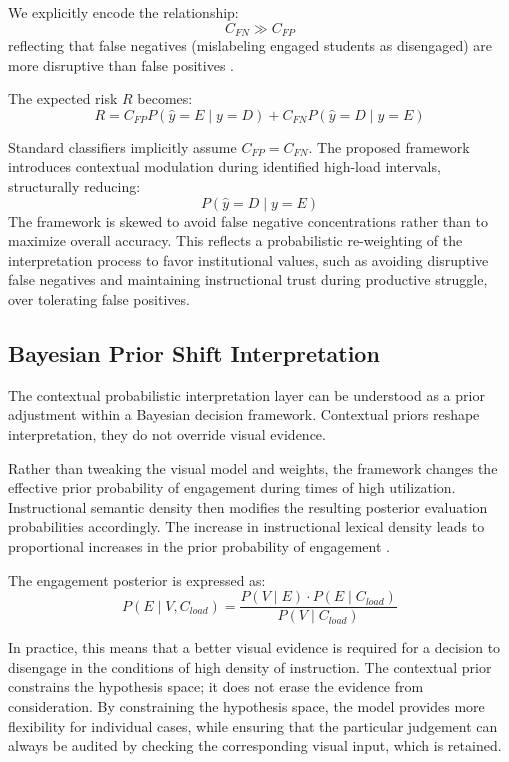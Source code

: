 \documentclass[conference]{IEEEtran}
\begin{document}
We explicitly encode the relationship:
\begin{equation}
C_{FN} \gg C_{FP}
\end{equation}
reflecting that false negatives (mislabeling engaged students as disengaged) are more disruptive than false positives \cite{b18}.

The expected risk $R$ becomes:
\begin{equation}
R = C_{FP} P(\hat{y}=E \mid y=D) + C_{FN} P(\hat{y}=D \mid y=E)
\end{equation}

Standard classifiers implicitly assume $C_{FP} = C_{FN}$. The proposed framework introduces contextual modulation during identified high-load intervals, structurally reducing:
\begin{equation}
P(\hat{y}=D \mid y=E)
\end{equation}
The framework is skewed to avoid false negative concentrations rather than to maximize overall accuracy. This reflects a probabilistic re-weighting of the interpretation process to favor institutional values, such as avoiding disruptive false negatives and maintaining instructional trust during productive struggle, over tolerating false positives.

\subsection{Bayesian Prior Shift Interpretation}

The contextual probabilistic interpretation layer can be understood as a prior adjustment within a Bayesian decision framework. Contextual priors reshape interpretation, they do not override visual evidence.

Rather than tweaking the visual model and weights, the framework changes the effective prior probability of engagement during times of high utilization. Instructional semantic density then modifies the resulting posterior evaluation probabilities accordingly. The increase in instructional lexical density leads to proportional increases in the prior probability of engagement \cite{b19}.

The engagement posterior is expressed as:
\begin{equation}
P(E \mid V, C_{load}) = \frac{P(V \mid E) \cdot P(E \mid C_{load})}{P(V \mid C_{load})}
\end{equation}

In practice, this means that a better visual evidence is required for a decision to disengage in the conditions of high density of instruction. The contextual prior constrains the hypothesis space; it does not erase the evidence from consideration. By constraining the hypothesis space, the model provides more flexibility for individual cases, while ensuring that the particular judgement can always be audited by checking the corresponding visual input, which is retained.
\end{document}

